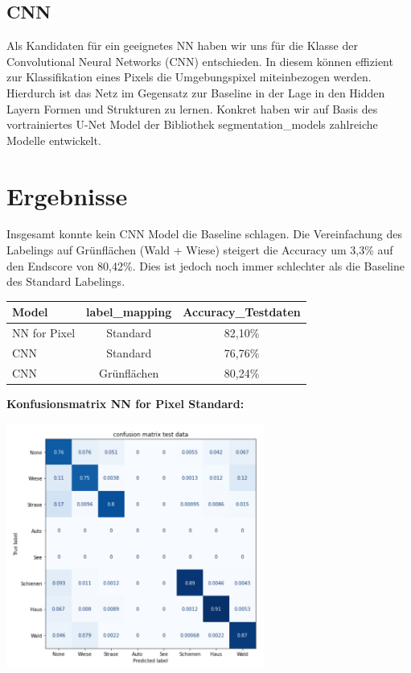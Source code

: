 \subsection{CNN}
Als Kandidaten für ein geeignetes NN haben wir uns für die Klasse der Convolutional Neural Networks (CNN) entschieden.
In diesem können effizient zur Klassifikation eines Pixels die Umgebungspixel miteinbezogen werden.
Hierdurch ist das Netz im Gegensatz zur Baseline in der Lage in den Hidden Layern Formen und Strukturen zu lernen.
Konkret haben wir auf Basis des vortrainiertes U-Net Model der Bibliothek segmentation\_models zahlreiche Modelle entwickelt.


\section{Ergebnisse}
Insgesamt konnte kein CNN Model die Baseline schlagen.
Die Vereinfachung des Labelings auf Grünflächen (Wald + Wiese) steigert die Accuracy um 3,3\% auf den Endscore von 80,42\%.
Dies ist jedoch noch immer schlechter als die Baseline des Standard Labelings.\\

\begin{tabular}[h]{l|c|c}
Model & label\_mapping & Accuracy\_Testdaten \\
\hline
NN for Pixel & Standard & 82,10\% \\
\hline
CNN & Standard & 76,76\% \\
\hline
CNN & Grünflächen\footnotemark[1] & 80,24\% \\
\end{tabular}

\smallskip


\bigskip

\textbf{Konfusionsmatrix NN for Pixel Standard:}

\begin{center}
\includegraphics[height=8cm]{../../data/models/baseline3_nn_for_pixel_confusion_matrix_test_data}
\end{center}

